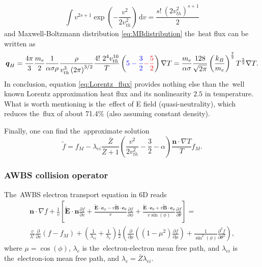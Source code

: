 \documentclass[preprint,12pt]{elsarticle}
\newcommand{\pdv}[2]{\frac{\partial{#1}}{\partial{#2}}}
\newcommand{\vect}[1]{\boldsymbol{#1}}
\newcommand{\dI}{\text{d}}
\newcommand{\mfpe}{\lambda_e}
\newcommand{\mfpei}{\lambda_{ei}}
\newcommand{\Zbar}{\bar{Z}}
\newcommand{\vmag}{v}
\newcommand{\vth}{v_{th}}
\newcommand{\vn}{\vect{n}}
\newcommand{\tE}{\vect{\tilde{E}}}
\newcommand{\tB}{\vect{\tilde{B}}}
\newcommand{\me}{m_e}
\newcommand{\kB}{k_B}
\newcommand{\crs}{\sigma}
\newcommand{\fM}{f_M}
\newcounter{bla}
\begin{document}
\begin{equation}
  \int \vmag^{2s+1} \exp\left(-\frac{\vmag^2}{2\vth^2}\right)\, \dI\vmag = 
  \frac{s!~(2 \vth^2)^{s+1}}{2}
  \nonumber 
\end{equation}
and Maxwell-Boltzmann distribution \eqref{eq:MBdistribution} the~heat flux can 
be written as
\begin{equation}
  \vect{q}_H = \frac{4\pi}{3}\frac{\me}{2}\frac{1}{\alpha \crs\rho}
  \frac{\rho}{\vth^3 \left( 2 \pi \right)^{3/2}}
  \frac{4!~2^4 \vth^{10}}{T} \left( 
  \textcolor{blue}{
  5 - \frac{3}{2}
  }
  \textcolor{red}{
  - \frac{5}{2}
  }
  \right) \nabla T 
  = \frac{\me}{\alpha \crs}\frac{128}{\sqrt{2 \pi}}
  \left(\frac{\kB}{\me}\right)^{\frac{7}{2}}T^{\frac{5}{2}} \nabla T .
  \label{eq:Lorentz_flux}
\end{equation} 
In conclusion, equation \eqref{eq:Lorentz_flux} provides nothing else than
the~well known Lorentz approximation heat flux and its nonlinearity $2.5$
in temperature. What is worth mentioning is the~effect of E field 
(quasi-neutrality), which reduces the~flux of about	71.4$\%$ 
(also assuming constant density).


Finally, one can find the~approximate solution
\begin{equation}
  \tilde{f} = \fM - \mfpei\frac{\Zbar}{\Zbar+1}
  \left( \frac{\vmag^2}{2 \vth^2} - \frac{3}{2} - \alpha\right)
  \frac{\vn\cdot\nabla T}{T}\fM .
  \label{eq:BGK_approximate_solution}
\end{equation}


\subsubsection{AWBS collision operator}\label{sec:AWBS_cop}
The~AWBS electron transport equation in 6D reads
\begin{multline}
  \vn\cdot\nabla f + \frac{1}{\vmag} \left[ \tE\cdot\vn \pdv{f}{\vmag} 
  + \frac{\tE\cdot\vect{e}_\phi 
  - \vmag\tB\cdot\vect{e}_\theta}{\vmag}\pdv{f}{\phi}
  + \frac{\tE\cdot\vect{e}_\theta + \vmag\tB\cdot\vect{e}_\phi}
  {\vmag\sin(\phi)}\pdv{f}{\theta} \right] 
  =\\
  \frac{\vmag}{\lambda^e}\pdv{}{\vmag}\left(f - f_M\right) 
  + \left(\frac{1}{\mfpei} + \frac{1}{\mfpe} \right) \frac{1}{2}
  \left(\pdv{}{\mu}\left((1 - \mu^2)\pdv{f}{\mu}\right)
  + \frac{1}{\sin^2(\phi)}\frac{\partial^2f}{\partial\theta^2} \right) ,
  \label{eq:AWBS_spherical}
\end{multline}
where $\mu = \cos(\phi)$, $\mfpe$ is the~electron-electron mean free path, and
$\mfpei$ is the~electron-ion mean free path, and $\mfpe = \Zbar \mfpei$.
\end{document}
